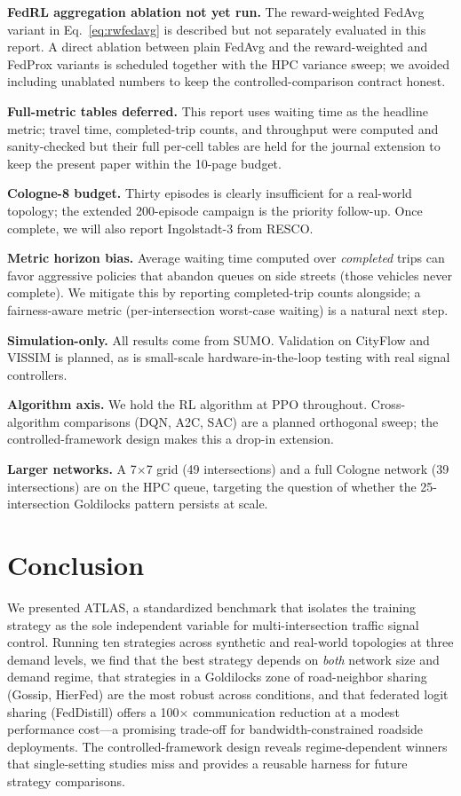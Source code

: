 \documentclass[conference]{IEEEtran}
\begin{document}
\textbf{FedRL aggregation ablation not yet run.} The reward-weighted FedAvg variant in Eq.~\eqref{eq:rwfedavg} is described but not separately evaluated in this report. A direct ablation between plain FedAvg and the reward-weighted and FedProx variants is scheduled together with the HPC variance sweep; we avoided including unablated numbers to keep the controlled-comparison contract honest.

\textbf{Full-metric tables deferred.} This report uses waiting time as the headline metric; travel time, completed-trip counts, and throughput were computed and sanity-checked but their full per-cell tables are held for the journal extension to keep the present paper within the 10-page budget.

\textbf{Cologne-8 budget.} Thirty episodes is clearly insufficient for a real-world topology; the extended 200-episode campaign is the priority follow-up. Once complete, we will also report Ingolstadt-3 from RESCO.

\textbf{Metric horizon bias.} Average waiting time computed over \emph{completed} trips can favor aggressive policies that abandon queues on side streets (those vehicles never complete). We mitigate this by reporting completed-trip counts alongside; a fairness-aware metric (per-intersection worst-case waiting) is a natural next step.

\textbf{Simulation-only.} All results come from SUMO. Validation on CityFlow and VISSIM is planned, as is small-scale hardware-in-the-loop testing with real signal controllers.

\textbf{Algorithm axis.} We hold the RL algorithm at PPO throughout. Cross-algorithm comparisons (DQN, A2C, SAC) are a planned orthogonal sweep; the controlled-framework design makes this a drop-in extension.

\textbf{Larger networks.} A 7$\times$7 grid (49 intersections) and a full Cologne network (39 intersections) are on the HPC queue, targeting the question of whether the 25-intersection Goldilocks pattern persists at scale.

\section{Conclusion}\label{sec:conclusion}

We presented ATLAS, a standardized benchmark that isolates the training strategy as the sole independent variable for multi-intersection traffic signal control. Running ten strategies across synthetic and real-world topologies at three demand levels, we find that the best strategy depends on \emph{both} network size and demand regime, that strategies in a Goldilocks zone of road-neighbor sharing (Gossip, HierFed) are the most robust across conditions, and that federated logit sharing (FedDistill) offers a 100$\times$ communication reduction at a modest performance cost---a promising trade-off for bandwidth-constrained roadside deployments. The controlled-framework design reveals regime-dependent winners that single-setting studies miss and provides a reusable harness for future strategy comparisons.
\end{document}

